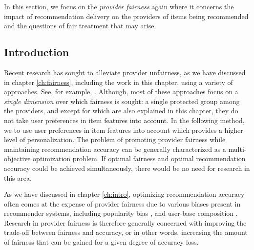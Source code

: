\label{sec:ofair}



In this section, we focus on the \textit{provider fairness} again where it concerns the impact of recommendation delivery on the providers of items being recommended and the questions of fair treatment that may arise\cite{burke2017multisided}.

\subsection{Introduction}

Recent research has sought to alleviate provider unfairness, as we have discussed in chapter \ref{ch:fairness}, including the work in this chapter, using a variety of approaches. See, for example, \cite{yao2017beyond,burke2018balanced,ekstrand2018exploring,liu2019personalized,kamishima2016model,beutel2019fairness}. Although, most of these approaches focus on a \emph{single dimension} over which fairness is sought: a single protected group among the providers, and except for \cite{liu2019personalized,sonboli2020opportunistic} which are also explained in this chapter, they do not take user preferences in item features into account. In the following method, we to use user preferences in item features into account which provides a higher level of personalization. The problem of promoting provider fairness while maintaining recommendation accuracy can be generally characterized as a multi-objective optimization problem. If optimal fairness and optimal recommendation accuracy could be achieved simultaneously, there would be no need for research in this area. 

As we have discussed in chapter \ref{ch:intro}, optimizing recommendation accuracy often comes at the expense of provider fairness due to various biases present in recommender systems, including popularity bias \cite{celma2008hits,lee2014fairness}, and user-base composition \cite{lin2019crank, yao2017beyond}. Research in provider fairness is therefore generally concerned with improving the trade-off between fairness and accuracy, or in other words, increasing the amount of fairness that can be gained for a given degree of accuracy loss.

